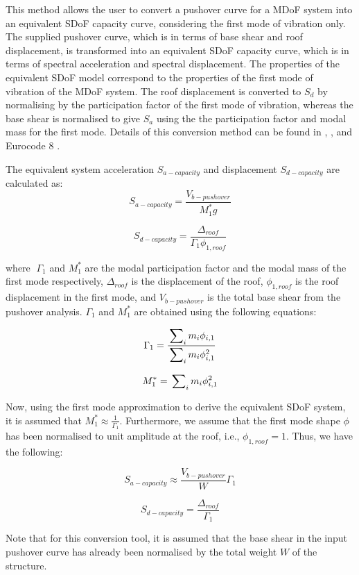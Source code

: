 This method allows the user to convert a pushover curve for a MDoF system into an equivalent SDoF capacity curve, considering the first mode of vibration only. The supplied pushover curve, which is in terms of base shear and roof displacement, is transformed into an equivalent SDoF capacity curve, which is in terms of spectral acceleration and spectral displacement. The properties of the equivalent SDoF model correspond to the properties of the first mode of vibration of the MDoF system. The roof displacement is converted to $S_d$ by normalising by the participation factor of the first mode of vibration, whereas the base shear is normalised to give $S_a$ using the the participation factor and modal mass for the first mode. Details of this conversion method can be found in \citet{ATC1996}, \citet{FEMA4402005}, and Eurocode 8 \citep{CEN2005}.

The equivalent system acceleration $S_{a-capacity}$ and displacement $S_{d-capacity}$ are calculated as:
\begin{equation}
	S_{a-capacity} = \frac{V_{b-pushover}}{M_{1}^{*} g}
\end{equation}

\begin{equation}
	S_{d-capacity} = \frac{\Delta_{roof}}{\Gamma_{1} \phi_{1, roof}}
\end{equation}

where 􏰁$\Gamma_{1}$ and $M_{1}^{*}$ are the modal participation factor and the modal mass of the first mode respectively, $\Delta_{roof}$ is the displacement of the roof, $\phi_{1, roof}$ is the roof displacement in the first mode, and $V_{b-pushover}$ is the total base shear from the pushover analysis. $\Gamma_{1}$ and $M_{1}^{*}$ are obtained using the following equations:

\begin{equation}
	\Gamma_{1} = \frac{\sideset{}{_i}\sum m_i \phi_{i,1}}{\sideset{}{_i}\sum m_i \phi_{i,1}^2}
\end{equation}

\begin{equation}
	M_{1}^{*} = \sideset{}{_i}\sum m_i \phi_{i,1}^2
\end{equation}

Now, using the first mode approximation to derive the equivalent SDoF system, it is assumed that $M_{1}^{*} \approx \frac{1}{\Gamma_{1}}$. Furthermore, we assume that the first mode shape $\phi$ has been normalised to unit amplitude at the roof, i.e., $\phi_{1, roof} = 1$. Thus, we have the following:

\begin{equation}
	S_{a-capacity} \approx \frac{V_{b-pushover}}{W} \Gamma_1
\end{equation}

\begin{equation}
	S_{d-capacity} = \frac{\Delta_{roof}}{\Gamma_1}
\end{equation}

Note that for this conversion tool, it is assumed that the base shear in the input pushover curve has already been normalised by the total weight $W$ of the structure.